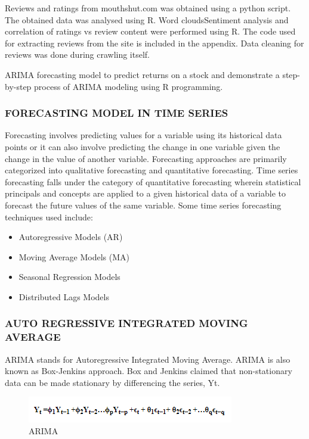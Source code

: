 \documentclass[a4paper, 12pt]{extarticle}
\begin{document}
{Reviews and ratings from mouthshut.com was obtained using a python script. The obtained data was analysed using R. Word cloudsSentiment analysis and correlation of ratings vs review content were performed using R. The code used for extracting reviews from the site is included in the appendix. Data cleaning for reviews was done during crawling itself.
 
ARIMA forecasting model to predict returns on a stock and demonstrate a step-by-step process of ARIMA modeling using R programming.
\subsubsection{FORECASTING MODEL IN TIME SERIES}
Forecasting involves predicting values for a variable using its historical data points or it can also involve predicting the change in one variable given the change in the value of another variable. Forecasting approaches are primarily categorized into qualitative forecasting and quantitative forecasting. Time series forecasting falls under the category of quantitative forecasting wherein statistical principals and concepts are applied to a given historical data of a variable to forecast the future values of the same variable. Some time series forecasting techniques used include:

\begin{itemize}
\item Autoregressive Models (AR)
\item Moving Average Models (MA)
\item Seasonal Regression Models
\item Distributed Lags Models
\end{itemize}

\subsubsection{AUTO REGRESSIVE INTEGRATED MOVING AVERAGE}
ARIMA stands for Autoregressive Integrated Moving Average. ARIMA is also known as Box-Jenkins approach. Box and Jenkins claimed that non-stationary data can be made stationary by differencing the series, Yt.

\begin{figure}[H]
\centering
\includegraphics[scale=1]{arima.png}
\caption {ARIMA}
\end{figure}

}
\end{document}
